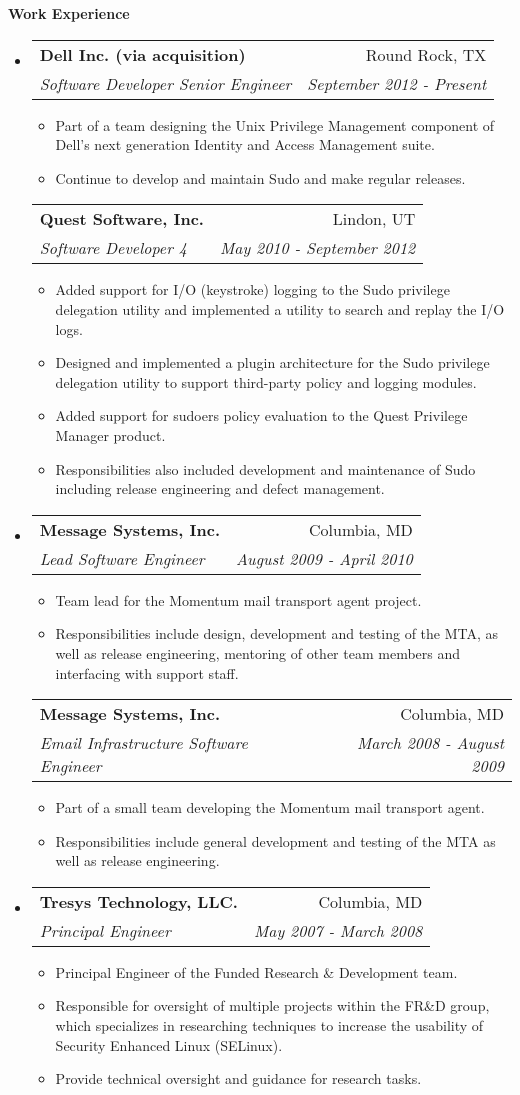 \documentclass[a4paper,11pt]{article}
\makeatletter
\newcommand{\resitem}[1]{\item #1 \vspace{-2pt}}
\newcommand{\resheading}[1]{{\large \colorbox{mygrey}{\begin{minipage}{\textwidth}{\textbf{#1 \vphantom{p\^{E}}}}\end{minipage}}}}
\newcommand{\ressubheading}[4]{
\begin{tabular*}{172mm}{l@{\extracolsep{\fill}}r}
		\textbf{#1} & #2 \\
		\textit{#3} & \textit{#4} \\
\end{tabular*}\vspace{-6pt}}
\makeatother
\begin{document}
\resheading{Work Experience}
\begin{itemize}
\item
	\ressubheading{Dell Inc. (via acquisition)}{Round Rock, TX}{Software Developer Senior Engineer}{September 2012 - Present}
	\begin{itemize}
		\resitem{Part of a team designing the Unix Privilege Management component of Dell's next generation Identity and Access Management suite.}
		\resitem{Continue to develop and maintain Sudo and make regular releases.}
	\end{itemize}
	\ressubheading{Quest Software, Inc.}{Lindon, UT}{Software Developer 4}{May 2010 - September 2012}
	\begin{itemize}
		\resitem{Added support for I/O (keystroke) logging to the Sudo privilege delegation utility and implemented a utility to search and replay the I/O logs.}
		\resitem{Designed and implemented a plugin architecture for the Sudo privilege delegation utility to support third-party policy and logging modules.}
		\resitem{Added support for sudoers policy evaluation to the Quest Privilege Manager product.}
		\resitem{Responsibilities also included development and maintenance of Sudo including release engineering and defect management.}
	\end{itemize}
\item
	\ressubheading{Message Systems, Inc.}{Columbia, MD}{Lead Software Engineer}{August 2009 - April 2010}
	\begin{itemize}
		\resitem{Team lead for the Momentum mail transport agent project.}
		\resitem{Responsibilities include design, development and testing of the MTA, as well as release engineering, mentoring of other team members and interfacing with support staff.}
	\end{itemize}
	\ressubheading{Message Systems, Inc.}{Columbia, MD}{Email Infrastructure Software Engineer}{March 2008 - August 2009}
	\begin{itemize}
		\resitem{Part of a small team developing the Momentum mail transport agent.}
		\resitem{Responsibilities include general development and testing of the MTA as well as release engineering.}
	\end{itemize}

\item
	\ressubheading{Tresys Technology, LLC.}{Columbia, MD}{Principal Engineer}{May 2007 - March 2008}
	\begin{itemize}
		\resitem{Principal Engineer of the Funded Research \& Development team.}
		\resitem{Responsible for oversight of multiple projects within the FR\&D group, which specializes in researching techniques to increase the usability of Security Enhanced Linux (SELinux).}
		\resitem{Provide technical oversight and guidance for research tasks.}
	\end{itemize}


\end{itemize}
\end{document}
